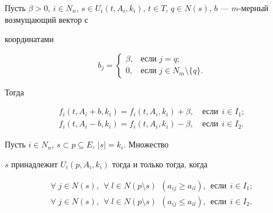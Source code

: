 \begin{pty}\label{pr5}


Пусть $\beta>0$, $i \in N_n$, $s \in U_i(t, A_i, k_i)$, $t\in


T$, $q \in N(s)$, $b$ --- $m$-мерный возмущающий вектор с


координатами


$$


b_{j}=


\begin{cases}


\beta, & \text{если } j=q;\\


0, & \text{если } j \in N_m \setminus \{ q\}.


\end{cases}


$$


Тогда


\begin{gather*}


f_i(t, A_i+b, k_i)=f_i(t, A_i, k_i)+\beta,\quad  \text{если}\ \ i \in I_1;\\


f_i(t, A_i-b, k_i)=f_i(t, A_i, k_i)-\beta,\quad  \text{если} \ \ i \in I_2.


\end{gather*}


\end{pty}





\begin{pty}\label{pr6}


Пусть $i\in N_n$, $s\subset p\subseteq E$, $|s|=k_i$. Множество


$s$ принадлежит $U_i(p, A_i, k_i)$ тогда и только тогда, когда


\begin{gather*}


\forall\; j\in N(s),\ \ \forall\; l\in N(p\setminus s)\ \ (a_{ij}\geq


a_{il}),\ \ \text{если}\ \ i\in I_1;\\


%


\forall\; j\in N(s),\ \ \forall\; l\in N(p\setminus s) \ \ (a_{ij}\leq


a_{il}),\ \ \text{если} \ \ i\in I_2.


\end{gather*}


\end{pty}





